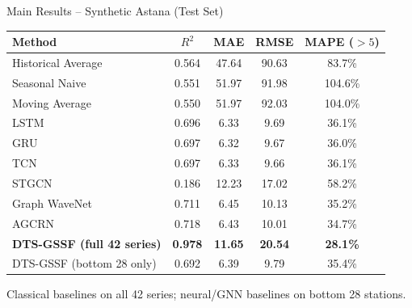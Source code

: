 \documentclass[aspectratio=169, 11pt]{beamer}
\newenvironment{tableslide}[1]{%
  \begin{frame}{#1}%
  \vspace{-0.3em}%
}{%
  \end{frame}%
}
\begin{document}
\begin{tableslide}{Main Results -- Synthetic Astana (Test Set)}
\vfill
\begin{center}
\footnotesize
\begin{tabular}{lcccc}
  \toprule
  \textbf{Method} & \textbf{$R^2$} & \textbf{MAE} & \textbf{RMSE} & \textbf{MAPE ($>5$)} \\
  \midrule
  Historical Average & 0.564 & 47.64 & 90.63 & 83.7\% \\
  Seasonal Naive & 0.551 & 51.97 & 91.98 & 104.6\% \\
  Moving Average & 0.550 & 51.97 & 92.03 & 104.0\% \\
  \midrule
  LSTM & 0.696 & 6.33 & 9.69 & 36.1\% \\
  GRU & 0.697 & 6.32 & 9.67 & 36.0\% \\
  TCN & 0.697 & 6.33 & 9.66 & 36.1\% \\
  \midrule
  STGCN & 0.186 & 12.23 & 17.02 & 58.2\% \\
  Graph WaveNet & 0.711 & 6.45 & 10.13 & 35.2\% \\
  AGCRN & 0.718 & 6.43 & 10.01 & 34.7\% \\
  \midrule
  \textbf{DTS-GSSF (full 42 series)} & \textbf{\color{accent}0.978} & \textbf{\color{accent}11.65} & \textbf{\color{accent}20.54} & \textbf{\color{accent}28.1\%} \\
  DTS-GSSF (bottom 28 only) & 0.692 & 6.39 & 9.79 & 35.4\% \\
  \bottomrule
\end{tabular}
\end{center}
\vfill
\begin{center}
{\footnotesize Classical baselines on all 42 series; neural/GNN baselines on bottom 28 stations.}
\end{center}
\vspace{0.3em}
\end{tableslide}
\end{document}
